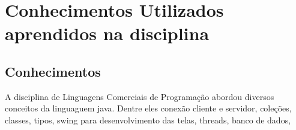 \chapter{Conhecimentos Utilizados aprendidos na disciplina}\label{ch-aula}

\section{Conhecimentos}

A disciplina de Linguagens Comerciais de Programação abordou diversos conceitos da linguaguem java. Dentre eles conexão cliente e servidor, coleções, classes, tipos, swing para desenvolvimento das telas, threads, banco de dados, 
